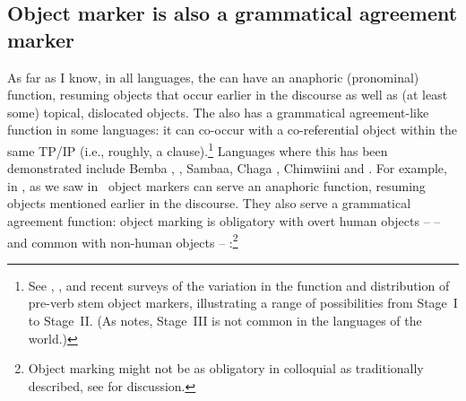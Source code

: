 \documentclass[output=paper]{LSP/langsci}
\begin{document}
\subsection{Object marker is also a grammatical agreement marker}
\label{02-do-sec:2-2}

As far as I know, in all  languages, the  can have an anaphoric (pronominal) function, resuming objects that occur earlier in the discourse as well as (at least some) topical, dislocated objects. 
The  also has a grammatical agreement-like function in some  languages: it can co-occur with a co-referential object within the same TP/IP (i.e., roughly, a clause).\footnote{See , ,  and  recent surveys of the variation in the function and distribution of pre-verb stem object markers, illustrating a range of possibilities from \citet{Creissels2006Typology} Stage~I to Stage~II. 
(As \citealt{Creissels2006Typology} notes, Stage~III is not common in the languages of the world.)} 
Languages where this has been demonstrated include Bemba \citep{Martenetal2012Object}, , Sambaa, Chaga \citep[59]{Riedel2009Syntax}, Chimwiini \citep{Kisseberthetal1977Chimwini} and  \citep{Baxetal2012Information}. 
For example, in , as we saw in~ object markers can serve an anaphoric function, resuming objects mentioned earlier in the discourse. 
They also serve a grammatical agreement function: object marking is obligatory with overt human objects –  – and common with  non-human objects – :\footnote{Object marking might not be as obligatory in colloquial  as traditionally described, see \citet{Seidletal1997Discourse} for discussion.} 
 
\end{document}
